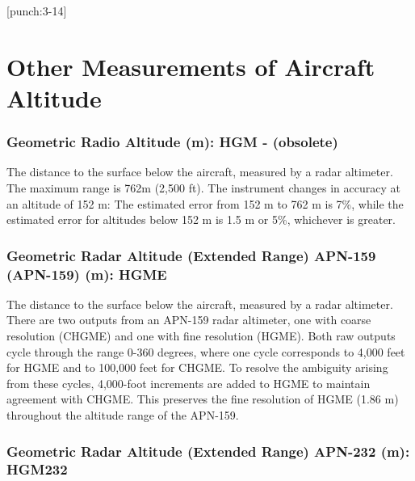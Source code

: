 \documentclass[
  english,
]{book}
\begin{document}
\protect\hypertarget{punch:3-14}{}{{[}punch:3-14{]}}

\hypertarget{other-measurements-of-aircraft-altitude}{%
\section{Other Measurements of Aircraft Altitude}\label{other-measurements-of-aircraft-altitude}}

\hypertarget{hgm}{%
\subsubsection*{Geometric Radio Altitude (m): HGM - (obsolete)}\label{hgm}}

The distance to the surface below the aircraft, measured by a radar altimeter. The maximum range is 762m (2,500 ft). The instrument changes in accuracy at an altitude of 152 m: The estimated error from 152 m to 762 m is 7\%, while the estimated error for altitudes below 152 m is 1.5 m or 5\%, whichever is greater.

\hypertarget{hgme-159}{%
\subsubsection*{Geometric Radar Altitude (Extended Range) APN-159 (APN-159) (m): HGME}\label{hgme-159}}

The distance to the surface below the aircraft, measured by a radar altimeter. There are two outputs from an APN-159 radar altimeter, one with coarse resolution (CHGME) and one with fine resolution (HGME). Both raw outputs cycle through the range 0-360 degrees, where one cycle corresponds to 4,000 feet for HGME and to 100,000 feet for CHGME. To resolve the ambiguity arising from these cycles, 4,000-foot increments are added to HGME to maintain agreement with CHGME. This preserves the fine resolution of HGME (1.86 m) throughout the altitude range of the APN-159.

\hypertarget{hgm-232}{%
\subsubsection*{Geometric Radar Altitude (Extended Range) APN-232 (m): HGM232}\label{hgm-232}}
\end{document}
